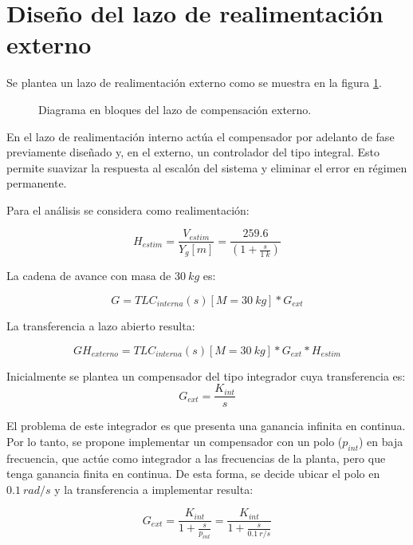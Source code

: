 \section{Diseño del lazo de realimentación externo}

\noindent Se plantea un lazo de realimentación externo como se muestra en la figura \ref{fig:diag-externo}. 

\begin{figure}[H]
	\centering
	
	\caption{Diagrama en bloques del lazo de compensación externo.}	\label{fig:diag-externo}
\end{figure}

En el lazo de realimentación interno actúa el compensador por adelanto de fase previamente diseñado y, en el externo, un controlador del tipo integral. Esto permite suavizar la respuesta al escalón del sistema y eliminar el error en régimen permanente.


\noindent Para el an\'{a}lisis se considera como realimentaci\'{o}n: 

\[H_{estim}=\frac{V_{estim}}{Y_g[m]}= \frac{259.6}{(1 + \frac{s}{1\:k})
}\] 

\noindent La cadena de avance con masa de $30\:kg$ es:

\begin{equation} \label{eq_cadena_avance_integrador}
	G=TLC_{interna}(s)[M=30\:kg]*G_{ext}
\end{equation}

La transferencia a lazo abierto resulta:

\begin{equation} \label{eq_lazo_abierto_externo}
	GH_{externo}=TLC_{interna}(s)[M=30\:kg]*G_{ext}*H_{estim}
\end{equation}

Inicialmente se plantea un compensador del tipo integrador cuya transferencia es:
\begin{equation}
	G_{ext}= \frac{K_{int}}{s}
\end{equation}

El problema de este integrador es que presenta una ganancia infinita en continua. Por lo tanto, se propone implementar un compensador con un polo ($p_{int}$) en baja frecuencia, que actúe como integrador a las frecuencias de la planta, pero que tenga ganancia finita en continua. De esta forma, se decide ubicar el polo en $0.1\:rad/s$ y la transferencia a implementar resulta:

\begin{equation}
	G_{ext}=\frac{K_{int}}{1+\frac{s}{p_{int}}}=\frac{K_{int}}{1+\frac{s}{0.1\:r/s}}	
\end{equation}

